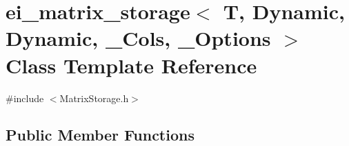\hypertarget{classei__matrix__storage_3_01_t_00_01_dynamic_00_01_dynamic_00_01___cols_00_01___options_01_4}{\section{ei\-\_\-matrix\-\_\-storage$<$ T, Dynamic, Dynamic, \-\_\-\-Cols, \-\_\-\-Options $>$ Class Template Reference}
\label{classei__matrix__storage_3_01_t_00_01_dynamic_00_01_dynamic_00_01___cols_00_01___options_01_4}
}


{\ttfamily \#include $<$Matrix\-Storage.\-h$>$}

\subsection*{Public Member Functions}

